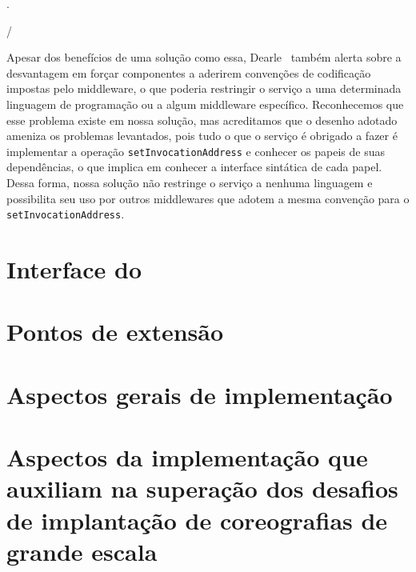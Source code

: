 .

/

Apesar dos benefícios de uma solução como essa, Dearle~\cite{Dearle2007PastPresentFuture} também alerta sobre a desvantagem em forçar componentes a aderirem convenções de codificação impostas pelo middleware, o que poderia restringir o serviço a uma determinada linguagem de programação ou a algum middleware específico. Reconhecemos que esse problema existe em nossa solução, mas acreditamos que o desenho adotado ameniza os problemas levantados, pois tudo o que o serviço é obrigado a fazer é implementar a operação \texttt{setInvocationAddress} e conhecer os papeis de suas dependências, o que implica em conhecer a interface sintática de cada papel. Dessa forma, nossa solução não restringe o serviço a nenhuma linguagem e possibilita seu uso por outros middlewares que adotem a mesma convenção para o \texttt{setInvocationAddress}.

\section{Interface do \ee}
\label{sec:interface}

\section{Pontos de extensão}
\label{sec:extensao}

\section{Aspectos gerais de implementação}

\section{Aspectos da implementação que auxiliam na superação dos desafios de implantação de coreografias de grande escala}
